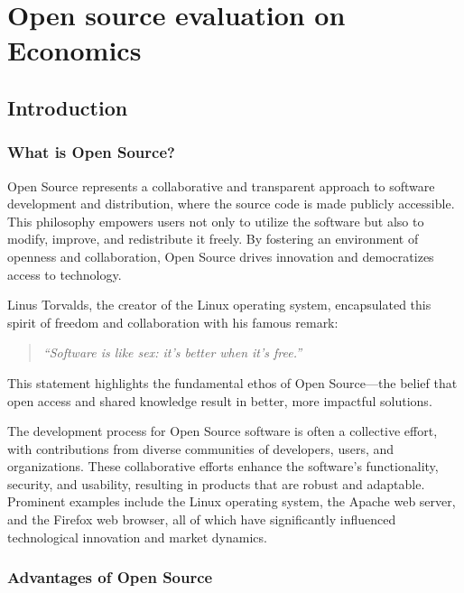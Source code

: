 \chapter{Open source evaluation on Economics}
\label{cha:Open_source_evaluation_Economics}

\section{Introduction}

\subsection{What is Open Source?}

Open Source represents a collaborative and transparent approach to software development and distribution, 
where the source code is made publicly accessible. This philosophy empowers users not only to utilize the software but also to modify, 
improve, and redistribute it freely. By fostering an environment of openness and collaboration, 
Open Source drives innovation and democratizes access to technology.

Linus Torvalds, the creator of the Linux operating system, encapsulated this spirit of freedom and collaboration with his famous remark:

\begin{quote}
    \textit{“Software is like sex: it's better when it's free.”}
    \author{Linus Torvalds}
\end{quote}

\cite{Linus_Torvalds_quote_open_source}

This statement highlights the fundamental ethos of Open Source—the belief that open access and shared knowledge result in better, more impactful solutions.


The development process for Open Source software is often a collective effort, 
with contributions from diverse communities of developers, users, and organizations. 
These collaborative efforts enhance the software's functionality, security, and usability, 
resulting in products that are robust and adaptable. Prominent examples include the Linux operating system, 
the Apache web server, and the Firefox web browser, all of which have significantly influenced technological innovation and market dynamics.

\subsection{Advantages of Open Source}

